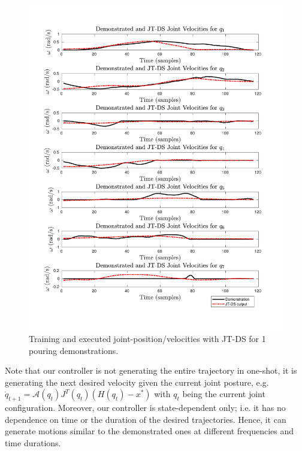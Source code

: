 \documentclass{article}
\begin{document}
\begin{figure}[!th]
\begin{minipage}{0.5\textwidth}
       	\includegraphics[trim={1.2cm 1.5cm 1.7cm 1.5cm},clip,width=\linewidth]{../../src/JTDS_mat_lib/figures/jtd_vel_pour1.pdf}
    \end{minipage}
   \caption{Training and executed joint-position/velocities with JT-DS for 1 pouring demonstrations. \label{fig:jtds_velocities}}
\end{figure}

Note that our controller is not generating the entire trajectory in one-shot, it is generating the next desired velocity given the current joint posture, e.g. $\dot{q}_{t+1} = \mathcal{A}(q_{t})J^T(q_{t})(H(q_{t})-x^*)$ with $q_t$ being the current joint configuration. Moreover, our controller is state-dependent only; i.e. it has no dependence on time or the duration of the desired trajectories. Hence, it can generate motions similar to the demonstrated ones at different frequencies and time durations. \\
\end{document}

